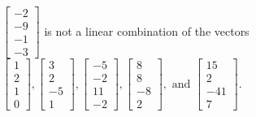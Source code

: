 \begin{exercise}
\begin{exerciseStatement}
  \end{exerciseStatement}
  \begin{exerciseAnswer}
   \(\left[\begin{array}{c}
-2 \\
-9 \\
-1 \\
-3
\end{array}\right]\) 
  	 is not  
	a linear combination of the vectors \(\left[\begin{array}{c}
1 \\
2 \\
1 \\
0
\end{array}\right] , \left[\begin{array}{c}
3 \\
2 \\
-5 \\
1
\end{array}\right] , \left[\begin{array}{c}
-5 \\
-2 \\
11 \\
-2
\end{array}\right] , \left[\begin{array}{c}
8 \\
8 \\
-8 \\
2
\end{array}\right] , \text{ and } \left[\begin{array}{c}
15 \\
2 \\
-41 \\
7
\end{array}\right]\).

	
  


  \end{exerciseAnswer}
\end{exercise}